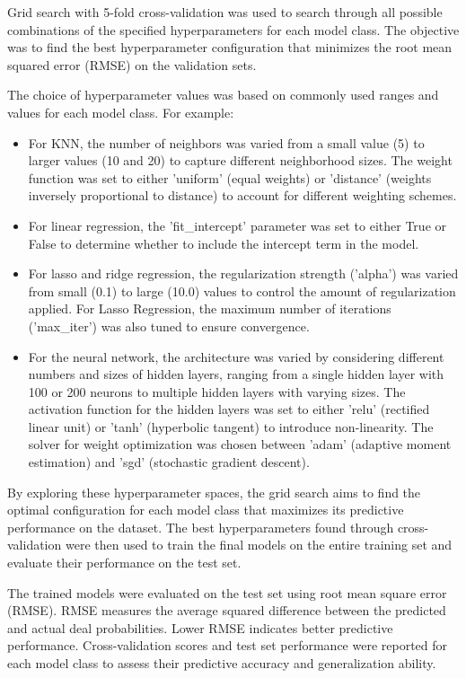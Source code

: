 \documentclass{article}
\begin{document}
Grid search with 5-fold cross-validation was used to search through all possible combinations of the specified hyperparameters for each model class. The objective was to find the best hyperparameter configuration that minimizes the root mean squared error (RMSE) on the validation sets.

The choice of hyperparameter values was based on commonly used ranges and values for each model class. For example:
\begin{itemize}
   \item For KNN, the number of neighbors was varied from a small value (5) to larger values (10 and 20) to capture different neighborhood sizes. The weight function was set to either 'uniform' (equal weights) or 'distance' (weights inversely proportional to distance) to account for different weighting schemes.
   \item For linear regression, the 'fit\_intercept' parameter was set to either True or False to determine whether to include the intercept term in the model.
   \item For lasso and ridge regression, the regularization strength ('alpha') was varied from small (0.1) to large (10.0) values to control the amount of regularization applied. For Lasso Regression, the maximum number of iterations ('max\_iter') was also tuned to ensure convergence.
   \item For the neural network, the architecture was varied by considering different numbers and sizes of hidden layers, ranging from a single hidden layer with 100 or 200 neurons to multiple hidden layers with varying sizes. The activation function for the hidden layers was set to either 'relu' (rectified linear unit) or 'tanh' (hyperbolic tangent) to introduce non-linearity. The solver for weight optimization was chosen between 'adam' (adaptive moment estimation) and 'sgd' (stochastic gradient descent).
\end{itemize}

By exploring these hyperparameter spaces, the grid search aims to find the optimal configuration for each model class that maximizes its predictive performance on the dataset. The best hyperparameters found through cross-validation were then used to train the final models on the entire training set and evaluate their performance on the test set.


The trained models were evaluated on the test set using root mean square error (RMSE). RMSE measures the average squared difference between the predicted and actual deal probabilities. Lower RMSE indicates better predictive performance. Cross-validation scores and test set performance were reported for each model class to assess their predictive accuracy and generalization ability.
\end{document}
